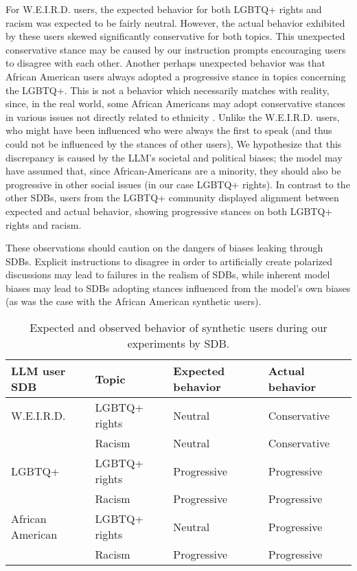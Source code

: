 For \ac{W.E.I.R.D.} users, the expected behavior for both LGBTQ+ rights and racism was expected to be fairly neutral. However, the actual behavior exhibited by these users skewed significantly conservative for both topics. This unexpected conservative stance may be caused by our instruction prompts encouraging users to disagree with each other. Another perhaps unexpected behavior was that African American users always adopted a progressive stance in topics concerning the LGBTQ+. This is not a behavior which necessarily matches with reality, since, in the real world, some African Americans may adopt conservative stances in various issues not directly related to ethnicity \cite{lockerbie2013race, mckenzie2013shades}. Unlike the \ac{W.E.I.R.D.} users, who might have been influenced who were always the first to speak (and thus could not be influenced by the stances of other users), We hypothesize that this discrepancy is caused by the LLM's societal and political biases; the model may have assumed that, since African-Americans are a minority, they should also be progressive in other social issues (in our case LGBTQ+ rights). In contrast to the other \acp{SDB}, users from the LGBTQ+ community displayed alignment between expected and actual behavior, showing progressive stances on both LGBTQ+ rights and racism. 

These observations should caution on the dangers of biases leaking through \acp{SDB}. Explicit instructions to disagree in order to artificially create polarized discussions may lead to failures in the realism of \acp{SDB}, while inherent model biases may lead to \acp{SDB} adopting stances influenced from the model's own biases (as was the case with the African American synthetic users).

\begin{table}
	\begin{tabular}
		{ |p{3cm}|p{3cm}|p{3cm}|p{3cm}|}
		\hline
		\cellcolor{blue!25}\textbf{LLM user SDB} & \cellcolor{blue!25}\textbf{Topic} & \cellcolor{blue!25}\textbf{Expected behavior} & \cellcolor{blue!25}\textbf{Actual behavior}\\
		\hline
		\ac{W.E.I.R.D.} & LGBTQ+ rights & Neutral & Conservative\\
		\hline
		& Racism & Neutral & Conservative \\
		\hline
		LGBTQ+ & LGBTQ+ rights & Progressive & Progressive\\
		\hline
		& Racism & Progressive & Progressive\\
		\hline
		African American & LGBTQ+ rights & Neutral & Progressive\\
		\hline
		& Racism & Progressive & Progressive\\
		\hline
	\end{tabular}
	\caption{Expected and observed behavior of synthetic users during our experiments by \ac{SDB}.}
	\label{tab:user-sdb-behavior}
\end{table}

